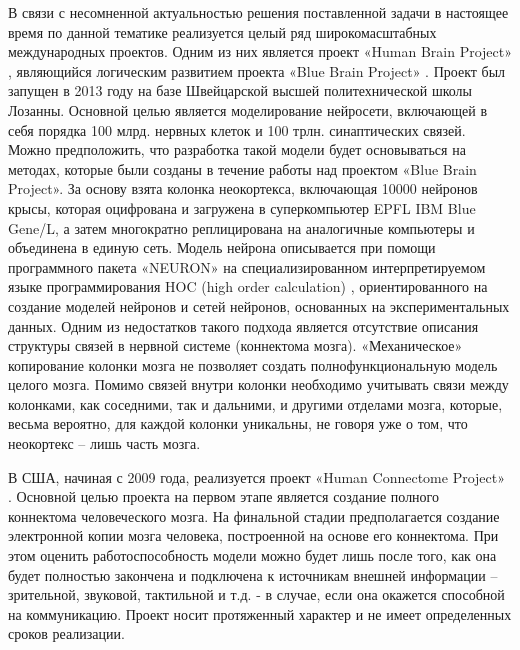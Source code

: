 В связи с несомненной актуальностью решения поставленной задачи в настоящее время по данной тематике реализуется целый ряд широкомасштабных международных проектов. Одним из них является проект «Human Brain Project» \cite{Markram2011}, являющийся логическим развитием проекта «Blue Brain Project» \cite{Markram2006}. Проект был запущен в 2013 году на базе Швейцарской высшей политехнической школы Лозанны. Основной целью является моделирование нейросети, включающей в себя порядка 100 млрд. нервных клеток и 100 трлн. синаптических связей. Можно предположить, что разработка такой модели будет основываться на методах, которые были созданы в течение работы над проектом «Blue Brain Project». За основу взята колонка неокортекса, включающая 10000 нейронов крысы, которая оцифрована и загружена в суперкомпьютер EPFL IBM Blue Gene/L, а затем многократно реплицирована на аналогичные компьютеры и объединена в единую сеть. Модель нейрона описывается при помощи программного пакета «NEURON» \cite{Carnevale2006} на специализированном интерпретируемом языке программирования HOC (high order calculation) \cite{Kernighan1983}, ориентированного на создание моделей нейронов и сетей нейронов, основанных на экспериментальных данных. Одним из недостатков такого подхода является отсутствие описания структуры связей в нервной системе (коннектома мозга). «Механическое» копирование колонки мозга не позволяет создать полнофункциональную модель целого мозга. Помимо связей внутри колонки необходимо учитывать связи между колонками, как соседними, так и дальними, и другими отделами мозга, которые, весьма вероятно, для каждой колонки уникальны, не говоря уже о том, что неокортекс – лишь часть мозга.

В США, начиная с 2009 года, реализуется проект «Human Connectome Project» \cite{Elam2013}. Основной целью проекта на первом этапе является создание полного коннектома человеческого мозга. На финальной стадии предполагается создание электронной копии мозга человека, построенной на основе его коннектома. При этом оценить работоспособность модели можно будет лишь после того, как она будет полностью закончена и подключена к источникам внешней информации – зрительной, звуковой, тактильной и т.д. - в случае, если она окажется способной на коммуникацию. Проект носит протяженный характер и не имеет определенных сроков реализации.

